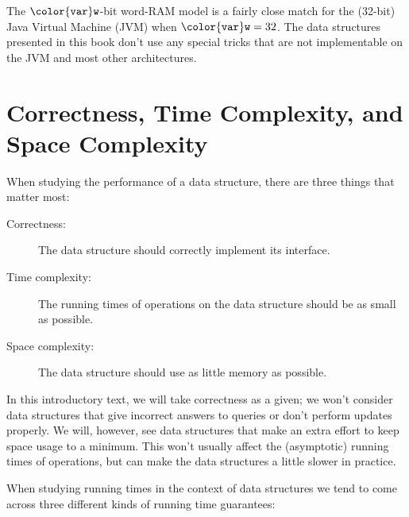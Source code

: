 \documentclass[10pt]{book}
\newcommand{\cpponly}[1]{}\newcommand{\javaonly}[1]{#1}\newcommand{\pcodeonly}[1]{}\newcommand{\notpcode}[1]{#1}\newcommand{\lang}{Java}
\theoremstyle{plain}
\theoremstyle{definition}
\begin{document}
\javaonly{The \ensuremath{\mathtt{{\color{var}w}}}-bit word-RAM model is a fairly close match for the
(32-bit) Java Virtual Machine (JVM) when $\ensuremath{\mathtt{{\color{var}w}}}=32$.}\cpponly{The \ensuremath{\mathtt{{\color{var}w}}}-bit
word-RAM model is a fairly close match for modern desktop computers when
$\ensuremath{\mathtt{{\color{var}w}}}=32$ or $\ensuremath{\mathtt{{\color{var}w}}}=64$.} The data structures presented in this book don't
use any special tricks that are not implementable \javaonly{on the JVM and most
other architectures.}\cpponly{in C++ on most architectures.}

\section{Correctness, Time Complexity, and Space Complexity}

When studying the performance of a data structure, there are three things
that matter most:

\begin{description}
  \item[Correctness:] The data structure should correctly implement
    its interface.
  \item[Time complexity:] The running times of operations on the data
    structure should be as small as possible.
  \item[Space complexity:] The data structure should use as little memory
    as possible.
\end{description}


In this introductory text, we will take correctness as a given;  we
won't consider data structures that give incorrect answers to queries or
don't perform updates properly.  We will, however, see data structures
that make an extra effort to keep space usage to a minimum.  This won't
usually affect the (asymptotic) running times of operations, but can
make the data structures a little slower in practice.

When studying running times in the context of data structures we tend to
come across three different kinds of running time guarantees:
\end{document}

